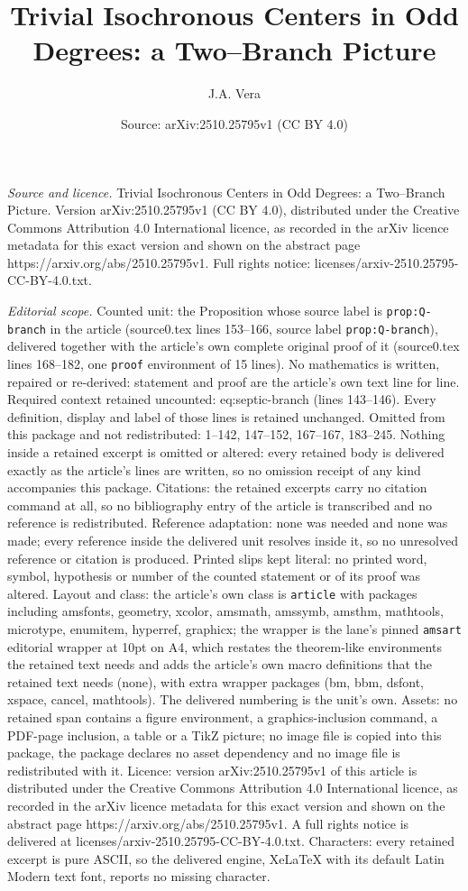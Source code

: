 \documentclass[10pt,a4paper]{amsart}
\title[Trivial Isochronous Centers in Odd Degrees: a Two--Branch Pi]{Trivial Isochronous Centers in Odd Degrees: a Two--Branch Picture}
\author{J.A. Vera}
\date{Source: arXiv:2510.25795v1 (CC BY 4.0)}
\begin{document}
\maketitle

\noindent\emph{Source and licence.} Trivial Isochronous Centers in Odd Degrees: a Two--Branch Picture. Version arXiv:2510.25795v1 (CC BY 4.0), distributed under the Creative Commons Attribution 4.0 International licence, as recorded in the arXiv licence metadata for this exact version and shown on the abstract page https://arxiv.org/abs/2510.25795v1. Full rights notice: licenses/arxiv-2510.25795-CC-BY-4.0.txt.\par\smallskip

\noindent\textit{Editorial scope.} Counted unit: the Proposition whose source label is \texttt{prop:Q-branch} in the article (source0.tex lines 153--166, source label \texttt{prop:Q-branch}), delivered together with the article's own complete original proof of it (source0.tex lines 168--182, one \texttt{proof} environment of 15 lines). No mathematics is written, repaired or re-derived: statement and proof are the article's own text line for line. Required context retained uncounted: eq:septic-branch (lines 143--146). Every definition, display and label of those lines is retained unchanged. Omitted from this package and not redistributed: 1--142, 147--152, 167--167, 183--245. Nothing inside a retained excerpt is omitted or altered: every retained body is delivered exactly as the article's lines are written, so no omission receipt of any kind accompanies this package. Citations: the retained excerpts carry no citation command at all, so no bibliography entry of the article is transcribed and no reference is redistributed. Reference adaptation: none was needed and none was made; every reference inside the delivered unit resolves inside it, so no unresolved reference or citation is produced. Printed slips kept literal: no printed word, symbol, hypothesis or number of the counted statement or of its proof was altered. Layout and class: the article's own class is \texttt{article} with packages including amsfonts, geometry, xcolor, amsmath, amssymb, amsthm, mathtools, microtype, enumitem, hyperref, graphicx; the wrapper is the lane's pinned \texttt{amsart} editorial wrapper at 10pt on A4, which restates the theorem-like environments the retained text needs and adds the article's own macro definitions that the retained text needs (none), with extra wrapper packages (bm, bbm, dsfont, xspace, cancel, mathtools). The delivered numbering is the unit's own. Assets: no retained span contains a figure environment, a graphics-inclusion command, a PDF-page inclusion, a table or a TikZ picture; no image file is copied into this package, the package declares no asset dependency and no image file is redistributed with it. Licence: version arXiv:2510.25795v1 of this article is distributed under the Creative Commons Attribution 4.0 International licence, as recorded in the arXiv licence metadata for this exact version and shown on the abstract page https://arxiv.org/abs/2510.25795v1. A full rights notice is delivered at licenses/arxiv-2510.25795-CC-BY-4.0.txt. Characters: every retained excerpt is pure ASCII, so the delivered engine, XeLaTeX with its default Latin Modern text font, reports no missing character.
\end{document}
